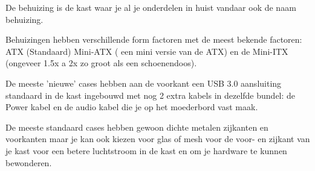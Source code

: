 De behuizing is de kast waar je al je onderdelen in huist vandaar ook de naam behuizing.

Behuizingen hebben verschillende form factoren met de meest bekende factoren: ATX (Standaard) Mini-ATX ( een mini versie van de ATX) en de Mini-ITX (ongeveer 1.5x a 2x zo groot als een schoenendoos).

De meeste 'nieuwe' cases hebben aan de voorkant een USB 3.0 aansluiting standaard in de kast ingebouwd met nog 2 extra kabels in dezelfde bundel: de Power kabel en de audio kabel die je op het moederbord vast maak.

De meeste standaard cases hebben gewoon dichte metalen zijkanten en voorkanten maar je kan ook kiezen voor glas of mesh voor de voor- en zijkant van je kast voor een betere luchtstroom in de kast en om je hardware te kunnen bewonderen.

